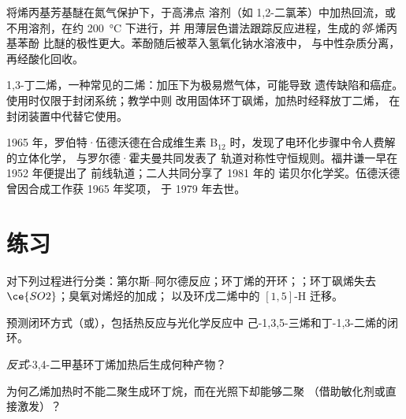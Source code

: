 \begin{inthelab}[克莱森重排]
将烯丙基芳基醚在氮气保护下，于高沸点
溶剂（如 1,2-二氯苯）中加热回流，或不用溶剂，在约 \qty{200}{\celsius} 下进行，并
用薄层色谱法跟踪反应进程，生成的\textit{邻}-烯丙基苯酚
比醚的极性更大。苯酚随后被萃入氢氧化钠水溶液中，
与中性杂质分离，再经酸化回收。
\end{inthelab}

\begin{safety}{}
1,3-丁二烯，一种常见的二烯：加压下为极易燃气体，可能导致
遗传缺陷和癌症。使用时仅限于封闭系统；教学中则
改用固体环丁砜烯，加热时经释放丁二烯，
在封闭装置中代替它使用。
\end{safety}

\begin{history}[轨道对称性]
1965 年，罗伯特·伍德沃德在合成维生素 B$_{12}$ 时，发现了电环化步骤中令人费解的立体化学，
与罗尔德·霍夫曼共同发表了
轨道对称性守恒规则。福井谦一早在 1952 年便提出了
前线轨道；二人共同分享了 1981 年的
诺贝尔化学奖。伍德沃德曾因合成工作获 1965 年奖项，
于 1979 年去世。
\end{history}

\section{练习}

\begin{exercise}[$\star$]\label{exo:b3:pericyclic:1}
对下列过程进行分类：第尔斯–阿尔德反应；环丁烯的开环；；环丁砜烯失去 $\ce{SO2}$；臭氧对烯烃的加成；
以及环戊二烯中的 $[1,5]$-H 迁移。
\end{exercise}

\begin{exercise}[$\star$]\label{exo:b3:pericyclic:2}
预测闭环方式（或），包括热反应与光化学反应中
己-1,3,5-三烯和丁-1,3-二烯的闭环。
\end{exercise}

\begin{exercise}[$\star$]\label{exo:b3:pericyclic:3}
\textit{反式}-3,4-二甲基环丁烯加热后生成何种产物？
\end{exercise}

\begin{exercise}[$\star$]\label{exo:b3:pericyclic:4}
为何乙烯加热时不能二聚生成环丁烷，而在光照下却能够二聚
（借助敏化剂或直接激发）？
\end{exercise}


